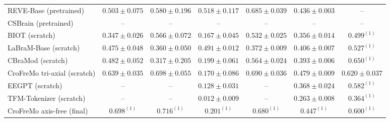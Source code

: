 \begin{table}[h]
\begin{tabular}{lcccccc}
REVE-Base (pretrained) & $0.503 \pm 0.075$ & $0.580 \pm 0.196$ & $0.518 \pm 0.117$ & $0.685 \pm 0.039$ & $0.436 \pm 0.003$ & -- \\
CSBrain (pretrained) & -- & -- & -- & -- & -- & -- \\
BIOT (scratch) & $0.347 \pm 0.026$ & $0.566 \pm 0.072$ & $0.167 \pm 0.045$ & $0.532 \pm 0.025$ & $0.356 \pm 0.014$ & $0.499^{(1)}$ \\
LaBraM-Base (scratch) & $0.475 \pm 0.048$ & $0.360 \pm 0.050$ & $0.491 \pm 0.012$ & $0.372 \pm 0.009$ & $0.406 \pm 0.007$ & $0.527^{(1)}$ \\
CBraMod (scratch) & $0.482 \pm 0.052$ & $0.317 \pm 0.205$ & $0.199 \pm 0.061$ & $0.564 \pm 0.024$ & $0.393 \pm 0.006$ & $0.650^{(1)}$ \\
CroFreMo tri-axial (scratch) & $0.639 \pm 0.035$ & $0.698 \pm 0.055$ & $0.170 \pm 0.086$ & $0.690 \pm 0.036$ & $0.479 \pm 0.009$ & $0.620 \pm 0.037$ \\
EEGPT (scratch) & -- & -- & $0.128 \pm 0.031$ & -- & $0.368 \pm 0.024$ & $0.582^{(1)}$ \\
TFM-Tokenizer (scratch) & -- & -- & $0.012 \pm 0.009$ & -- & $0.263 \pm 0.008$ & $0.364^{(1)}$ \\
CroFreMo axis-free (final) & $0.698^{(1)}$ & $0.716^{(1)}$ & $0.201^{(1)}$ & $0.680^{(1)}$ & $0.447^{(1)}$ & $0.600^{(1)}$ \\
\bottomrule
\end{tabular}
\end{table}

